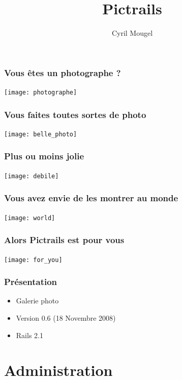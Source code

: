 \documentclass{beamer}
\title{Pictrails}
\author{Cyril Mougel}
\begin{document}
\begin{frame}
    \titlepage
\end{frame}

\begin{frame}
	\frametitle{Vous êtes un photographe ?}
    \begin{center}
    \texttt{[image: photographe]}
    \end{center}
\end{frame}

\begin{frame}
    \frametitle{Vous faites toutes sortes de photo}
    \begin{center}
    \texttt{[image: belle\_photo]}
    \end{center}
\end{frame}

\begin{frame}
    \frametitle{Plus ou moins jolie}
    \begin{center}
    \texttt{[image: debile]}
    \end{center}
\end{frame}

\begin{frame}
    \frametitle{Vous avez envie de les montrer au monde}
    \begin{center}
    \texttt{[image: world]}
    \end{center}
\end{frame}

\begin{frame}
    \frametitle{Alors Pictrails est pour vous}
    \begin{center}
        \texttt{[image: for\_you]}
    \end{center}
\end{frame}

\begin{frame}
    \frametitle{Présentation}
    \begin{itemize}
        \item Galerie photo
        \item Version 0.6 (18 Novembre 2008)
        \item Rails 2.1
    \end{itemize}
\end{frame}

\section{Administration}
\begin{frame}
\end{frame}
\end{document}
